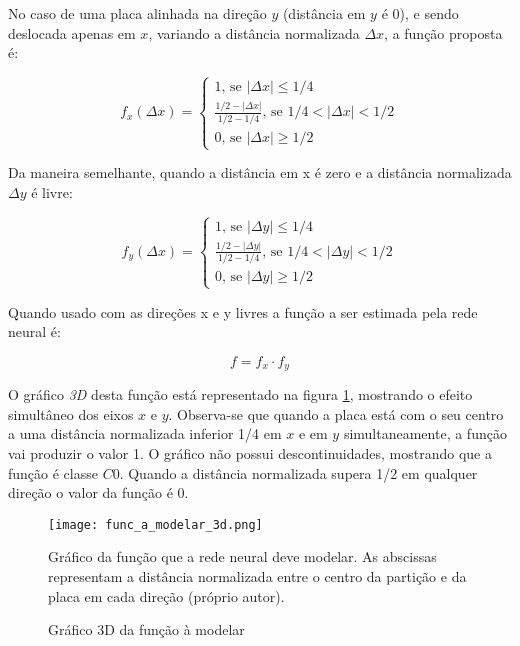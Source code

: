 No caso de uma placa alinhada na direção $y$ (distância em $y$ é 0), e sendo
deslocada apenas em $x$, variando a distância normalizada $\Delta x$, a função
proposta é:

\begin{equation}
	f_x(\Delta x) = \begin{cases}
		1 \text{, se } |\Delta x| \leq 1/4
		\\
		\frac{1/2-|\Delta x|}{1/2-1/4} \text{, se } 1/4<|\Delta x|<1/2
		\\
		0 \text{, se } |\Delta x| \geq 1/2
	\end{cases}
\end{equation}

Da maneira semelhante, quando a distância em x é zero e a distância 
normalizada $\Delta y$ é livre:

\begin{equation}
	f_y(\Delta x) = \begin{cases}
		1 \text{, se } |\Delta y| \leq 1/4
		\\
		\frac{1/2-|\Delta y|}{1/2-1/4} \text{, se } 1/4<|\Delta y|<1/2
		\\
		0 \text{, se } |\Delta y| \geq 1/2
	\end{cases}
\end{equation}

Quando usado com as direções x e y livres a função a ser estimada pela rede
neural é:

\begin{equation} \label{eq:funcao_a_modelar}
	f=f_x \cdot f_y
\end{equation}

O gráfico \emph{3D} desta função está representado na figura
\ref{fig:func_a_modelar_3d}, mostrando o
efeito simultâneo dos eixos $x$ e $y$.  Observa-se que quando a placa
está com o seu centro a uma distância normalizada inferior 1/4 em $x$ e em $y$
simultaneamente, a função vai produzir o valor 1. O gráfico não possui
descontinuidades, mostrando que a função é classe $C0$. Quando a distância
normalizada supera 1/2 em qualquer direção o valor da função é 0.

\begin{figure}[!htb]
	\centering
	\texttt{[image: func\_a\_modelar\_3d.png]}
	\caption{Gráfico 3D da função à modelar}
	\label{fig:func_a_modelar_3d}
	Gráfico da função que a rede neural deve modelar. As abscissas representam
	a distância normalizada entre o centro da partição e da placa em cada
	direção (próprio autor).
\end{figure}


